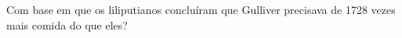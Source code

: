 Com base em que os liliputianos concluíram que Gulliver precisava de 1728 vezes mais comida do que eles?

